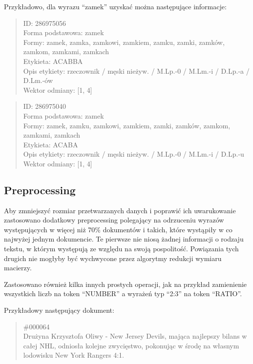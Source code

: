 \documentclass[11pt,a4paper]{article}
\begin{document}
Przykładowo, dla wyrazu ``zamek'' uzyskać można następujące informacje:

\begin{quote}
ID: 286975056\\
Forma podstawowa: zamek\\
Formy: zamek, zamka, zamkowi, zamkiem, zamku, zamki, zamków, zamkom, zamkami,
zamkach\\
Etykieta: ACABBA\\
Opis etykiety: rzeczownik / męski nieżyw. / M.Lp.-0 / M.Lm.-i / D.Lp.-a /
D.Lm.-ów\\
Wektor odmiany: [1, 4]\\
\end{quote}

\begin{quote}
ID: 286975040\\
Forma podstawowa: zamek\\
Formy: zamek, zamku, zamkowi, zamkiem, zamki, zamków, zamkom, zamkami,
zamkach\\
Etykieta: ACABA\\
Opis etykiety: rzeczownik / męski nieżyw. / M.Lp.-0 / M.Lm.-i / D.Lp.-u\\
Wektor odmiany: [1, 4]\\
\end{quote}

\subsection{Preprocessing}

Aby zmniejszyć rozmiar przetwarzanych danych i poprawić ich uwarukowanie
zastosowano dodatkowy preprocessing polegający na odrzuceniu wyrazów
występujących w więcej niż 70\% dokumentów i takich, które wystąpiły w co
najwyżej jednym dokumencie. Te pierwsze nie niosą żadnej informacji o rodzaju
tekstu, w którym występują ze względu na swoją pospolitość. Powiązania tych
drugich nie mogłyby być wychwycone przez algorytmy redukcji wymiaru macierzy.

Zastosowano również kilka innych prostych operacji, jak na przykład
zamienienie wszystkich liczb na token ``NUMBER'' a wyrażeń typ ``2:3''
na token ``RATIO''.

Przykładowy następujący dokument:

\begin{quote}
\#000064\\
Drużyna Krzysztofa Oliwy - New Jersey Devils, mająca najlepszy 
bilans w całej NHL, odniosła kolejne zwycięstwo, pokonując w 
środę na własnym lodowisku New York Rangers 4:1. 
\end{quote}
\end{document}
